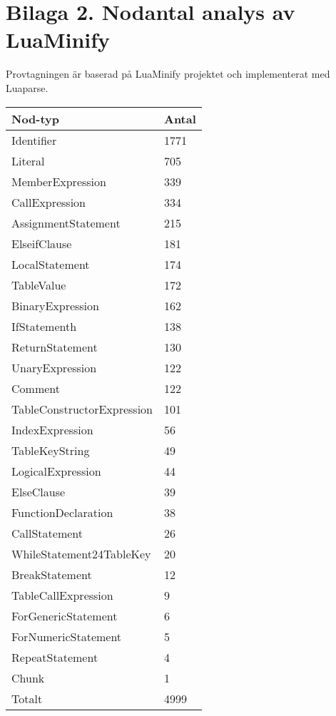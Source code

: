 \clearpage
{}
\section*{Bilaga 2. Nodantal analys av LuaMinify}

Provtagningen är baserad på LuaMinify projektet och implementerat med Luaparse.

\begin{table}[ht]
  \begin{tabular}{l l}
    Nod-typ & Antal \\
    \hline
    Identifier & 1771 \\
    Literal & 705 \\
    MemberExpression & 339 \\
    CallExpression & 334 \\
    AssignmentStatement & 215 \\
    ElseifClause & 181 \\
    LocalStatement & 174 \\
    TableValue & 172 \\
    BinaryExpression & 162 \\
    IfStatementh & 138 \\
    ReturnStatement & 130 \\
    UnaryExpression & 122 \\
    Comment & 122 \\
    TableConstructorExpression & 101 \\
    IndexExpression & 56 \\
    TableKeyString & 49 \\
    LogicalExpression & 44 \\
    ElseClause & 39 \\
    FunctionDeclaration & 38 \\
    CallStatement & 26 \\
    WhileStatement24TableKey & 20 \\
    BreakStatement & 12 \\
    TableCallExpression & 9 \\
    ForGenericStatement & 6 \\
    ForNumericStatement & 5 \\
    RepeatStatement & 4 \\
    Chunk & 1 \\
    \hline
    Totalt & 4999
  \end{tabular}
\end{table}


